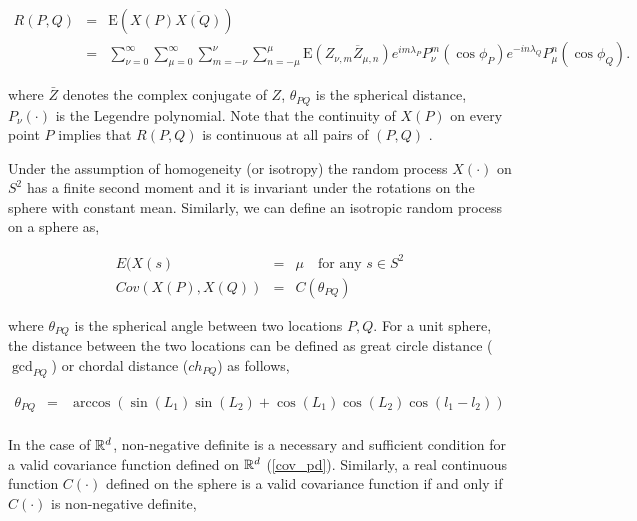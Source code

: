 		\begin{eqnarray*} \label{rpq_1}
			R(P, Q) &=& \mbox{E}(X(P) \overline{X(Q)}) \\
			&=& \sum_{\nu=0}^\infty \sum_{\mu=0}^\infty \sum_{m=-\nu}^{\nu} \sum_{n=-\mu}^{\mu} \mbox{E}(Z_{\nu,m} \overline{Z}_{\mu,n}) e^{im \lambda_P} P_{\nu}^m(\cos \phi_P) e^{-i n \lambda_Q} P_{\mu}^n (\cos \phi_Q).
		\end{eqnarray*}
			
		where $\bar{Z}$ denotes the complex conjugate of $Z$, $\theta_{PQ}$ is the spherical distance, $P_{\nu}(\cdot)$ is the Legendre polynomial. Note that the continuity of $X(P)$ on every point $P$ implies that $R(P, Q)$ is continuous at all pairs of $(P, Q)$ \cite[page 83]{Leadbetter1967}.



Under the assumption of homogeneity (or isotropy) the random process $X(\cdot)$ on $S^2$ has a finite second moment and it is invariant under the rotations on the sphere with constant mean. Similarly, we can define an isotropic random process on a sphere as, 

\begin{eqnarray*}
	E(X(s) &=& \mu \quad \mbox{for any } s\in S^2 \\
	Cov(X(P),X(Q)) &=& C(\theta_{PQ}) 
\end{eqnarray*}

where $\theta_{PQ}$ is the spherical angle between two locations $P,Q$. For a unit sphere, the distance between the two locations can be defined as great circle distance ($\gcd_{PQ}$) or chordal distance ($ch_{PQ}$) as follows,

\begin{eqnarray*}
	\theta_{PQ}  &=& \arccos\left(\sin(L_1)\sin(L_2) + \cos(L_1)\cos(L_2)\cos(l_1-l_2)\right)\\
\end{eqnarray*}

In the case of $\mathbb{R}^d$, non-negative definite is a necessary and sufficient condition for a valid covariance function defined on $\mathbb{R}^d$ (\ref{cov_pd}). Similarly, a real continuous function $C(\cdot)$ defined on the sphere is a valid covariance function if and only if $C(\cdot)$ is non-negative definite,

